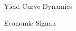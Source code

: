 \documentclass[10pt]{article}
\begin{document}
    \begin{core}{Yield Curve Dynamics}





    \end{core}

    \begin{core}{Economic Signals}


    \end{core}

\end{document}
